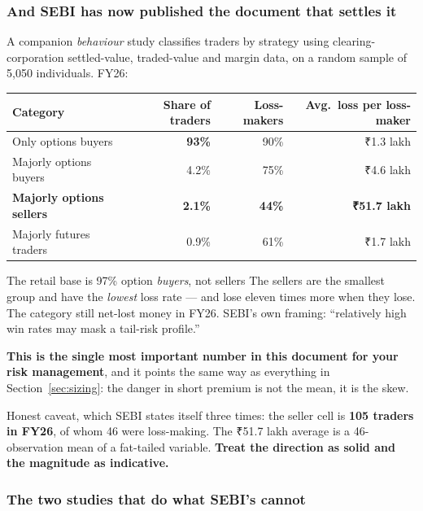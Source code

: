 \documentclass[11pt,a4paper]{article}
\newcommand{\rs}{₹}
\newcommand{\srcnote}[1]{{\footnotesize\color{soft}#1\par}}
\begin{document}
\subsubsection{And SEBI has now published the document that settles it}

A companion \emph{behaviour} study classifies traders by strategy using
clearing-corporation settled-value, traded-value and margin data, on a random
sample of 5{,}050 individuals. FY26:

\begin{center}
\begin{tabular}{@{}lrrr@{}}
\toprule
Category & Share of traders & Loss-makers & Avg.\ loss per loss-maker \\
\midrule
Only options buyers      & \textbf{93\%}  & 90\% & \rs 1.3 lakh \\
Majorly options buyers   & 4.2\%          & 75\% & \rs 4.6 lakh \\
\textbf{Majorly options sellers} & \textbf{2.1\%} & \textbf{44\%} & \textbf{\rs 51.7 lakh} \\
Majorly futures traders  & 0.9\%          & 61\% & \rs 1.7 lakh \\
\bottomrule
\end{tabular}
\end{center}

\begin{keyfact}{The retail base is 97\% option \emph{buyers}, not sellers}
The sellers are the smallest group and have the \emph{lowest} loss rate --- and
lose eleven times more when they lose. The category still net-lost money in FY26.
SEBI's own framing: ``relatively high win rates may mask a tail-risk profile.''

\textbf{This is the single most important number in this document for your risk
management}, and it points the same way as everything in Section~\ref{sec:sizing}:
the danger in short premium is not the mean, it is the skew.
\end{keyfact}

\srcnote{Honest caveat, which SEBI states itself three times: the seller cell is
\textbf{105 traders in FY26}, of whom 46 were loss-making. The \rs 51.7 lakh
average is a 46-observation mean of a fat-tailed variable. \textbf{Treat the
direction as solid and the magnitude as indicative.}}

\subsubsection{The two studies that do what SEBI's cannot}
\end{document}
